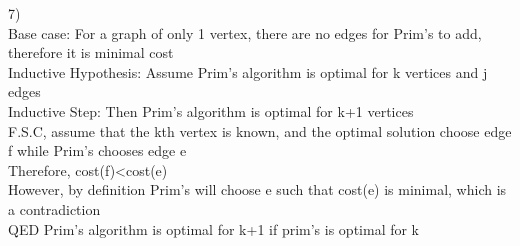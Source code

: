\documentclass[a4paper,12pt]{article}
\begin{document}
7)\\
Base case: For a graph of only 1 vertex, there are no edges for Prim's to add, therefore it is minimal cost\\
Inductive Hypothesis: Assume Prim's algorithm is optimal for k vertices and j edges\\
Inductive Step: Then Prim's algorithm is optimal for k+1 vertices\\
F.S.C, assume that the kth vertex is known, and the optimal solution choose edge f while Prim's chooses edge e\\
Therefore, cost(f)<cost(e)\\
However, by definition Prim's will choose e such that cost(e) is minimal, which is a contradiction\\
QED Prim's algorithm is optimal for k+1 if prim's is optimal for k\\
\end{document}
